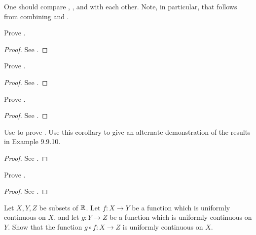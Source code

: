 \begin{rmk}\label{i:9.9.17}
  One should compare , , and  with each other.
  Note, in particular, that  follows from combining  and .
\end{rmk}

\exercisesection

\begin{ex}\label{i:ex:9.9.1}
  Prove .
\end{ex}

\begin{proof}
  See .
\end{proof}

\begin{ex}\label{i:ex:9.9.2}
  Prove .
\end{ex}

\begin{proof}
  See .
\end{proof}

\begin{ex}\label{i:ex:9.9.3}
  Prove .
\end{ex}

\begin{proof}
  See .
\end{proof}

\begin{ex}\label{i:ex:9.9.4}
  Use  to prove .
  Use this corollary to give an alternate demonstration of the results in Example 9.9.10.
\end{ex}

\begin{proof}
  See .
\end{proof}

\begin{ex}\label{i:ex:9.9.5}
  Prove .
\end{ex}

\begin{proof}
  See .
\end{proof}

\begin{ex}\label{i:ex:9.9.6}
  Let \(X, Y, Z\) be subsets of \(\mathbb{R}\).
  Let \(f : X \to Y\) be a function which is uniformly continuous on \(X\), and let \(g : Y \to Z\) be a function which is uniformly continuous on \(Y\).
  Show that the function \(g \circ f : X \to Z\) is uniformly continuous on \(X\).
\end{ex}

